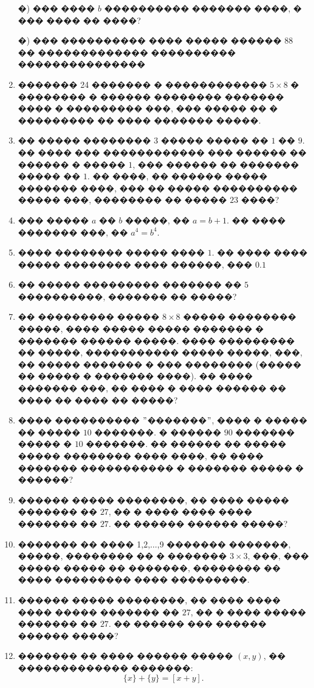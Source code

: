 \documentclass[a4paper,12pt]{article}
\begin{document}
\begin{enumerate}
    �) ��� ���� $b$ ���������� ������� ����, � ��� ���� �� ����?

    �) ��� ���������� ���� ����� ������ $88$ �� ������������� ���������� ���������������


\item ������� 24 ������� � ������������ $5\times 8$ � �������� � ������ �������� ������� ���� � ��������� ���, ��� ����� �� � ��������� �� ���� ������� �����.

\item �� ����� �������� $3$ ����� ����� �� $1$ �� $9$. �� ���� ��� ������������ ��� ������ �� ������ � ����� $1$, ��� ������ �� ������� ����� �� $1$. �� ����, �� ������ ����� ������� ����, ��� �� ����� ���������� ����� ���, �������� �� ����� $23$ ����?

\item ��� ����� $a$ �� $b$ �����, �� $a=b+1$. �� ���� ������� ���, �� $a^{4}=b^{4}$.

\item ���� �������� ����� ���� $1$. �� ���� ���� ����� �������� ���� ������, ��� $0.1$

\item �� ����� ��������� ������� �� $5$ ����������, ������� �� �����?

\item �� ��������� ����� $8\times 8$ ����� �������� �����, ���� ����� ����� ������� � ������� ������ �����. ���� ��������� �� �����, ����������� ����� �����, ���, �� ����� ������� � ��� �������� (����� �� ����� � ������� ����). �� ���� ������� ���, �� ���� � ���� ������ �� ���� �� ���� �� �����?


\item ���� ���������� $"$�������$"$, ���� � ����� �� ����� $10$ �������. � ������ $90$ ������� ����� � $10$ �������. �� ������ �� ����� ����� �������� ���� ����, �� ���� ������� ����������� � ������� ����� � ������?


\item ������ ����� ��������, �� ���� ����� ������� �� $27$, �� � ���� ���� ���� ������� �� $27$. �� ������ ������ �����?

\item ������� �� ���� 1,2,...,9 ������� �������, �����, �������� �� � ������� $3\times 3$, ���, ��� ����� ����� �� �������, �������� �� ���� ��������� ���� ���������.

\item ������ ����� ��������, �� ���� ���� ���� ����� ������� �� $27$, �� � ���� ����� ������� �� $27$. �� ������ ��� ������ ������ �����?

\item ������� �� ���� ������ ����� $(x, y)$, �� ������������� �������: $$\{x\}+\{y\}=[x+y].$$
\end{enumerate}
\end{document}
